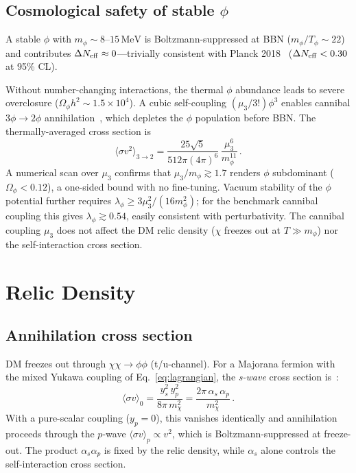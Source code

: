 \documentclass[aps,prd,twocolumn,superscriptaddress,nofootinbib]{revtex4-2}
\newcommand{\MeV}{\,\text{MeV}}
\newcommand{\mchi}{m_\chi}
\newcommand{\mphi}{m_\phi}
\newcommand{\Neff}{\Delta N_{\rm eff}}
\begin{document}
\subsection{Cosmological safety of stable $\phi$}\label{sec:neff}

A stable $\phi$ with $\mphi\sim 8\text{--}15\MeV$ is
Boltzmann-suppressed at BBN ($m_\phi/T_\phi\sim 22$) and contributes
$\Neff\approx 0$---trivially consistent with Planck
2018~\cite{Planck:2018vyg} ($\Neff < 0.30$ at 95\% CL).

Without number-changing interactions, the thermal $\phi$ abundance
leads to severe overclosure ($\Omega_\phi h^2 \sim 1.5\times 10^4$).
A cubic self-coupling $(\mu_{3}/3!)\phi^{3}$ enables cannibal
$3\phi\to 2\phi$ annihilation~\cite{Farina:2016llk}, which depletes
the $\phi$ population before BBN.  The thermally-averaged cross
section is~\cite{Farina:2016llk}
\begin{equation}\label{eq:cannibal}
  \langle\sigma v^{2}\rangle_{3\to 2}
  = \frac{25\sqrt{5}}{512\pi(4\pi)^{6}}\,
    \frac{\mu_3^{6}}{\mphi^{11}}\,.
\end{equation}
A numerical scan over $\mu_3$ confirms that
$\mu_3/\mphi\gtrsim 1.7$ renders $\phi$ subdominant
($\Omega_\phi < 0.12$), a one-sided bound with no fine-tuning.
Vacuum stability of the $\phi$ potential further requires
$\lambda_\phi \geq 3\mu_3^2/(16\mphi^2)$; for the benchmark
cannibal coupling this gives $\lambda_\phi \gtrsim 0.54$, easily
consistent with perturbativity.
The cannibal coupling $\mu_3$ does not affect the DM relic density
($\chi$ freezes out at $T\gg\mphi$) nor the self-interaction cross
section.

\section{Relic Density}\label{sec:relic}

\subsection{Annihilation cross section}\label{sec:ann_xs}

DM freezes out through $\chi\chi\to\phi\phi$ (t/u-channel).
For a Majorana fermion with the mixed Yukawa
coupling of Eq.~\eqref{eq:lagrangian}, the
\emph{s-wave} cross section is~\cite{Kahlhoefer:2017umn}:
\begin{equation}\label{eq:sigma_v_ann}
  \langle\sigma v\rangle_0
  = \frac{y_s^{2}\,y_p^{2}}{8\pi\,\mchi^{2}}
  = \frac{2\pi\,\alpha_s\,\alpha_p}{\mchi^{2}}\,.
\end{equation}
With a pure-scalar coupling ($y_p=0$), this vanishes identically
and annihilation proceeds through the $p$-wave
$\langle\sigma v\rangle_{p} \propto v^{2}$, which is
Boltzmann-suppressed at freeze-out.
The product $\alpha_s\alpha_p$ is fixed by the relic density,
while $\alpha_s$ alone controls the self-interaction cross section.
\end{document}
